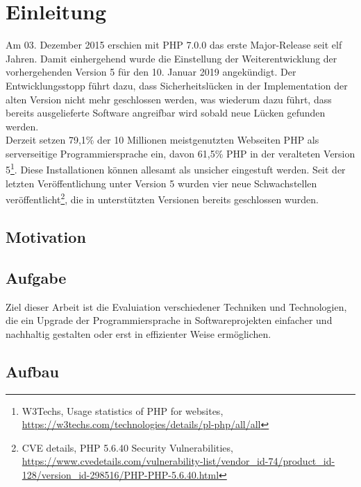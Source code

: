 \chapter{Einleitung}
Am 03. Dezember 2015 erschien mit PHP 7.0.0 das erste Major-Release seit elf Jahren. Damit einhergehend wurde die Einstellung der Weiterentwicklung der vorhergehenden Version
5 für den 10. Januar 2019 angekündigt. Der Entwicklungsstopp führt dazu, dass Sicherheitslücken in der Implementation der alten Version nicht mehr geschlossen werden, was 
wiederum dazu führt, dass bereits ausgelieferte Software angreifbar wird sobald neue Lücken gefunden werden. \\
Derzeit setzen 79,1\% der 10 Millionen meistgenutzten Webseiten PHP als serverseitige Programmiersprache ein, davon 61,5\% PHP in der veralteten Version 5\footnote{W3Techs, \glqq Usage statistics of PHP for websites\grqq , 
\url{https://w3techs.com/technologies/details/pl-php/all/all}}. Diese Installationen können allesamt als unsicher eingestuft werden. Seit der letzten Veröffentlichung 
unter Version 5 wurden vier neue Schwachstellen veröffentlicht\footnote{CVE details, \glqq PHP 5.6.40 Security Vulnerabilities\grqq , 
\url{https://www.cvedetails.com/vulnerability-list/vendor_id-74/product_id-128/version_id-298516/PHP-PHP-5.6.40.html}}, die in unterstützten Versionen bereits geschlossen 
wurden.

\section{Motivation}


\section{Aufgabe}
Ziel dieser Arbeit ist die Evaluiation verschiedener Techniken und Technologien, die ein Upgrade der Programmiersprache in Softwareprojekten einfacher und nachhaltig gestalten 
oder erst in effizienter Weise ermöglichen.

\section{Aufbau}